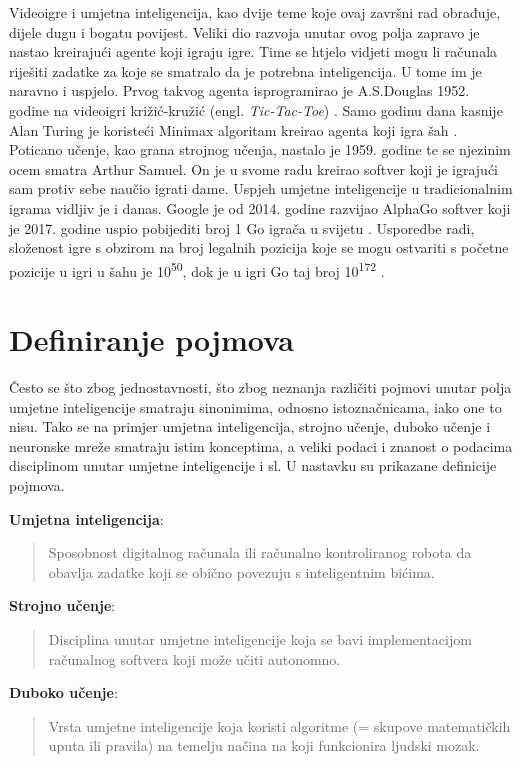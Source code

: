 \documentclass[]{foi} %
\begin{document}
Videoigre i umjetna inteligencija, kao dvije teme koje ovaj završni rad obrađuje, dijele dugu i bogatu povijest. Veliki dio razvoja unutar ovog polja zapravo je nastao kreirajući agente koji igraju igre. Time se htjelo vidjeti mogu li računala riješiti zadatke za koje se smatralo da je potrebna inteligencija. U tome im je naravno i uspjelo. Prvog takvog agenta isprogramirao je A.S.Douglas 1952. godine na videoigri križić-kružić (engl. \textit{Tic-Tac-Toe}) \cite[str. 8]{AIandGames}. Samo godinu dana kasnije Alan Turing je koristeći Minimax algoritam kreirao agenta koji igra šah \cite[str. 8]{AIandGames}. Poticano učenje, kao grana strojnog učenja, nastalo je 1959. godine te se njezinim ocem smatra Arthur Samuel. On je u svome radu kreirao softver koji je igrajući sam protiv sebe naučio igrati dame. Uspjeh umjetne inteligencije u tradicionalnim igrama vidljiv je i danas. Google je od 2014. godine razvijao AlphaGo softver \cite{pcGo} koji je 2017. godine uspio pobijediti broj 1 Go igrača u svijetu \cite{bbcGo}. Usporedbe radi, složenost igre s obzirom na broj legalnih pozicija koje se mogu ostvariti s početne pozicije u igri u šahu je 10\textsuperscript{50}, dok je u igri Go taj broj 10\textsuperscript{172} \cite{MonteCarloGo}. 

\section{Definiranje pojmova}
Često se što zbog jednostavnosti, što zbog neznanja različiti pojmovi unutar polja umjetne inteligencije smatraju sinonimima, odnosno istoznačnicama, iako one to nisu. Tako se na primjer umjetna inteligencija, strojno učenje, duboko učenje i neuronske mreže smatraju istim konceptima, a veliki podaci i znanost o podacima disciplinom unutar umjetne inteligencije i sl. U nastavku su prikazane definicije pojmova.

\textbf{Umjetna inteligencija}: \blockquote[{\cite{AIBrit}}]{Sposobnost digitalnog računala ili računalno kontroliranog robota da obavlja zadatke koji se obično povezuju s inteligentnim bićima.}

\textbf{Strojno učenje}: \blockquote[{\cite{MLBrit}}]{Disciplina unutar umjetne inteligencije koja se bavi implementacijom računalnog softvera koji može učiti autonomno.}

\textbf{Duboko učenje}: \blockquote[{\cite{DLCamb}}]{Vrsta umjetne inteligencije koja koristi algoritme (= skupove matematičkih uputa ili pravila) na temelju načina na koji funkcionira ljudski mozak. }
\end{document}
